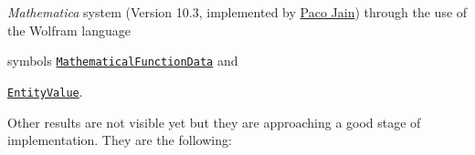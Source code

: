 
\textit{Mathematica} system (Version 10.3, implemented by \href{https://www.linkedin.com/in/paco-jain-20472297}{Paco Jain}) through the use of the Wolfram language    

symbols \href{https://reference.wolfram.com/language/ref/MathematicalFunctionData.html}{\texttt{MathematicalFunctionData}} and

\href{https://reference.wolfram.com/language/ref/EntityValue.html}{\texttt{EntityValue}}.





Other results are not visible yet but they are approaching a good stage of implementation. They are the following:

\itemsep=0mm  

\parsep=0mm 

